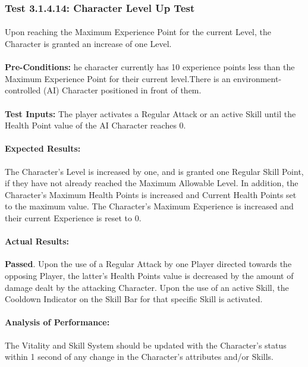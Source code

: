 \documentclass{article}
\begin{document}
    \subsubsection{Test 3.1.4.14: Character Level Up Test}
    \paragraph{} Upon reaching the Maximum Experience Point for the current Level, the Character is granted an increase of one Level.
    \paragraph{}\textbf{Pre-Conditions:} he character currently has 10 experience points less than the Maximum  Experience  Point  for  their  current  level.There  is  an  environment-controlled  (AI)  Character positioned in front of them.
    \paragraph{}\textbf{Test Inputs:} The  player  activates a Regular Attack or an active Skill until the Health Point value of the AI Character reaches 0.
    \paragraph{Expected Results:} The Character's Level is increased by one, and is granted one Regular Skill Point, if they have not already reached the Maximum Allowable Level. In addition, the Character's Maximum Health Points is increased and Current Health Points set to the maximum value. The Character's Maximum Experience is increased and their current Experience is reset to 0.
    \paragraph{Actual Results:} \textbf{Passed}. Upon the use of a Regular Attack by one Player directed towards the opposing Player, the latter's Health Points value is decreased by the amount of damage dealt by the attacking Character. Upon the use of an active Skill, the Cooldown Indicator on the Skill Bar for that specific Skill is activated.
     \paragraph{Analysis of Performance:} The Vitality and Skill System should be updated with the Character's status within 1 second of any change in the Character's attributes and/or Skills.
\end{document}
